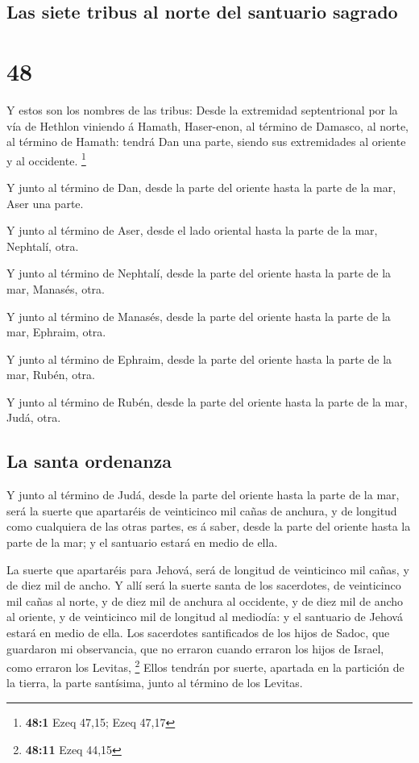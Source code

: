 \hypertarget{las-siete-tribus-al-norte-del-santuario-sagrado}{%
\subsection{Las siete tribus al norte del santuario
sagrado}\label{las-siete-tribus-al-norte-del-santuario-sagrado}}

\hypertarget{section-47}{%
\section{48}\label{section-47}}

 Y estos son los nombres de las tribus: Desde la
extremidad septentrional por la vía de Hethlon viniendo á Hamath,
Haser-enon, al término de Damasco, al norte, al término de Hamath:
tendrá Dan una parte, siendo sus extremidades al oriente y al occidente.
\footnote{\textbf{48:1} Ezeq 47,15; Ezeq 47,17}

 Y junto al término de Dan, desde la parte del oriente
hasta la parte de la mar, Aser una parte.

 Y junto al término de Aser, desde el lado oriental hasta
la parte de la mar, Nephtalí, otra.

 Y junto al término de Nephtalí, desde la parte del
oriente hasta la parte de la mar, Manasés, otra.

 Y junto al término de Manasés, desde la parte del oriente
hasta la parte de la mar, Ephraim, otra.

 Y junto al término de Ephraim, desde la parte del oriente
hasta la parte de la mar, Rubén, otra.

 Y junto al término de Rubén, desde la parte del oriente
hasta la parte de la mar, Judá, otra.

\hypertarget{la-santa-ordenanza}{%
\subsection{La santa ordenanza}\label{la-santa-ordenanza}}

 Y junto al término de Judá, desde la parte del oriente
hasta la parte de la mar, será la suerte que apartaréis de veinticinco
mil cañas de anchura, y de longitud como cualquiera de las otras partes,
es á saber, desde la parte del oriente hasta la parte de la mar; y el
santuario estará en medio de ella.

 La suerte que apartaréis para Jehová, será de longitud de
veinticinco mil cañas, y de diez mil de ancho.  Y allí
será la suerte santa de los sacerdotes, de veinticinco mil cañas al
norte, y de diez mil de anchura al occidente, y de diez mil de ancho al
oriente, y de veinticinco mil de longitud al mediodía: y el santuario de
Jehová estará en medio de ella.  Los sacerdotes
santificados de los hijos de Sadoc, que guardaron mi observancia, que no
erraron cuando erraron los hijos de Israel, como erraron los Levitas,
\footnote{\textbf{48:11} Ezeq 44,15}  Ellos tendrán por
suerte, apartada en la partición de la tierra, la parte santísima, junto
al término de los Levitas.

